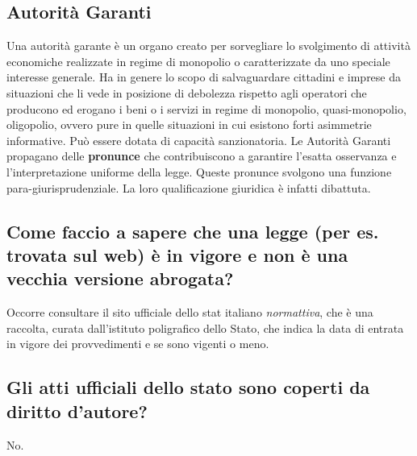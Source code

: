 \subsection{Autorità Garanti}
Una autorità garante è un organo creato per sorvegliare lo svolgimento di attività economiche realizzate in regime di monopolio o caratterizzate da uno speciale
interesse generale. Ha in genere lo scopo di salvaguardare cittadini e imprese da situazioni che li vede in posizione di debolezza rispetto agli operatori che producono
ed erogano i beni o i servizi in regime di monopolio, quasi-monopolio, oligopolio, ovvero pure in quelle situazioni in cui esistono forti asimmetrie informative. Può
essere dotata di capacità sanzionatoria. \newline
Le Autorità Garanti propagano delle \textbf{pronunce} che contribuiscono a garantire l'esatta osservanza e l'interpretazione uniforme della legge. Queste pronunce svolgono
una funzione para-giurisprudenziale. La loro qualificazione giuridica è infatti dibattuta.

\subsection{Come faccio a sapere che una legge (per es. trovata sul web) è in vigore e non è una vecchia
versione abrogata?}

Occorre consultare il sito ufficiale dello stat italiano \textit{normattiva}, che è una raccolta, curata dall'istituto poligrafico dello Stato, che indica la data di entrata in vigore dei provvedimenti e se sono vigenti o meno.

\subsection{Gli atti ufficiali dello stato sono coperti da diritto d'autore?}
No.